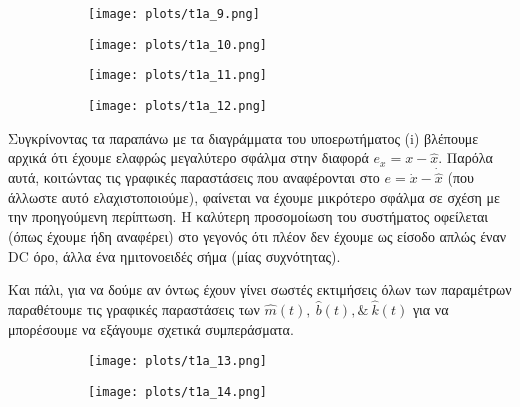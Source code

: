 \documentclass[12pt]{article} %
\numberwithin{equation}{section}  %
\begin{document}
\begin{figure}[h!]
    \begin{subfigure}{0.45\textwidth}
        \centering
        \texttt{[image: plots/t1a\_9.png]}
        \caption{}
        \label{fig:t1a_9}
    \end{subfigure}
    \hfill
    \begin{subfigure}{0.45\textwidth}
        \centering
        \texttt{[image: plots/t1a\_10.png]}
        \caption{}
        \label{fig:t1a_10}
    \end{subfigure}

\end{figure}

\begin{figure}[h!]
    \begin{subfigure}{0.45\textwidth}
        \centering
        \texttt{[image: plots/t1a\_11.png]}
        \caption{}
        \label{fig:t1a_11}
    \end{subfigure}
    \hfill
    \begin{subfigure}{0.45\textwidth}
        \centering
        \texttt{[image: plots/t1a\_12.png]}
        \caption{}
        \label{fig:t1a_12}
    \end{subfigure}

\end{figure}

Συγκρίνοντας τα παραπάνω με τα διαγράμματα του υποερωτήματος (i) βλέπουμε αρχικά ότι έχουμε ελαφρώς μεγαλύτερο σφάλμα στην διαφορά $e_x = x - \hat{x}$. Παρόλα αυτά, κοιτώντας τις γραφικές παραστάσεις που αναφέρονται στο $e = \dot{x} - \dot{\hat{x}}$ (που άλλωστε αυτό ελαχιστοποιούμε), φαίνεται να έχουμε μικρότερο σφάλμα σε σχέση με την προηγούμενη περίπτωση. Η καλύτερη προσομοίωση του συστήματος οφείλεται (όπως έχουμε ήδη αναφέρει) στο γεγονός ότι πλέον δεν έχουμε ως είσοδο απλώς έναν DC όρο, άλλα ένα ημιτονοειδές σήμα (μίας συχνότητας). 

Και πάλι, για να δούμε αν όντως έχουν γίνει σωστές εκτιμήσεις όλων των παραμέτρων παραθέτουμε τις γραφικές παραστάσεις των  $\hat{m}(t), \ \hat{b}(t), \& \ \hat{k}(t)$ για να μπορέσουμε να εξάγουμε σχετικά συμπεράσματα.

\begin{figure}[h!]
    \begin{subfigure}{0.45\textwidth}
        \centering
        \texttt{[image: plots/t1a\_13.png]}
        \caption{}
        \label{fig:t1a_13}
    \end{subfigure}
    \hfill
    \begin{subfigure}{0.45\textwidth}
        \centering
        \texttt{[image: plots/t1a\_14.png]}
        \caption{}
        \label{fig:t1a_14}
    \end{subfigure}

\end{figure}
\end{document}
